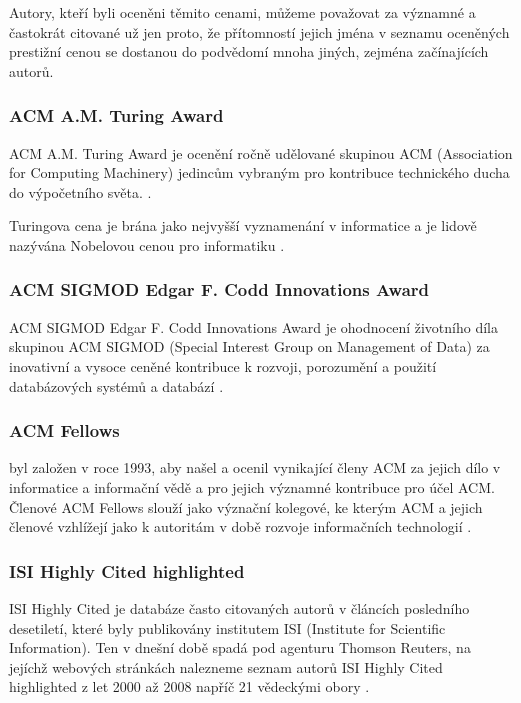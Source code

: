 \documentclass{bakalarka}
\begin{document}
Autory, kteří byli oceněni těmito cenami, můžeme považovat za významné a
častokrát citované už jen proto, že přítomností jejich jména v seznamu
oceněných prestižní cenou se dostanou do podvědomí mnoha jiných, zejména
začínajících autorů.

\subsubsection{ACM A.M. Turing Award}
ACM A.M. Turing Award je ocenění ročně udělované skupinou ACM (Association for
Computing Machinery) jedincům vybraným pro kontribuce technického ducha do
výpočetního světa.
\cite{turingaward}.

Turingova cena je brána jako nejvyšší vyznamenání v informatice a je lidově
nazývána Nobelovou cenou pro informatiku \cite[p.~317]{dasgupta}.

\subsubsection{ACM SIGMOD Edgar F. Codd Innovations Award}
ACM SIGMOD Edgar F. Codd Innovations Award je ohodnocení životního díla
skupinou ACM SIGMOD (Special Interest Group on Management of Data)  za
inovativní a vysoce ceněné kontribuce k rozvoji, porozumění a použití
databázových systémů a databází \cite{sigmodinnovations}.

\subsubsection{ACM Fellows}
 byl založen v roce 1993, aby našel a ocenil
vynikající členy ACM za jejich dílo v informatice a informační vědě a pro
jejich významné kontribuce pro účel ACM. Členové ACM Fellows slouží jako
význační kolegové, ke kterým ACM a jejich členové vzhlížejí jako k autoritám v
době rozvoje informačních technologií \cite{acmfellows}.

\subsubsection{ISI Highly Cited highlighted}
ISI Highly Cited je databáze často citovaných autorů v článcích posledního
desetiletí, které byly publikovány institutem ISI (Institute for Scientific
Information). Ten v dnešní době spadá pod agenturu Thomson Reuters, na jejíchž
webových stránkách nalezneme seznam autorů ISI Highly Cited highlighted z let
2000 až 2008 napříč 21 vědeckými obory \cite{highlycited}.
\end{document}
